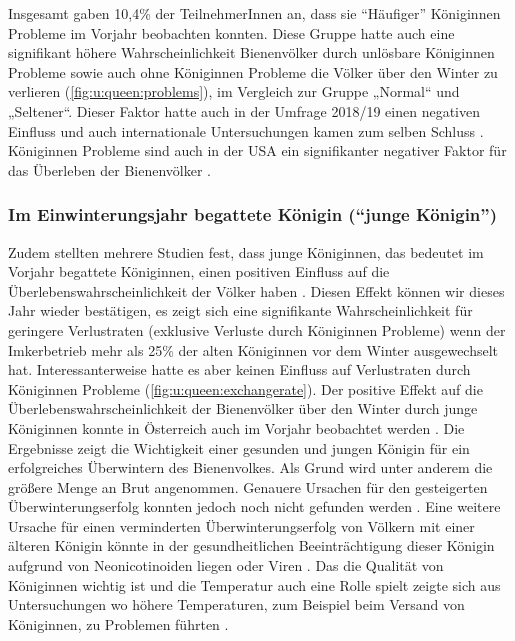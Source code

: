 Insgesamt gaben 10,4\% der TeilnehmerInnen an, dass sie \enquote{Häufiger} Königinnen Probleme im Vorjahr beobachten konnten. Diese Gruppe hatte auch eine signifikant höhere Wahrscheinlichkeit Bienenvölker durch unlösbare Königinnen Probleme sowie auch ohne Königinnen Probleme die Völker über den Winter zu verlieren (\cref{fig:u:queen:problems}), im Vergleich zur Gruppe „Normal`` und „Seltener``. Dieser Faktor hatte auch in der Umfrage 2018/19 einen negativen Einfluss \citep{oberreiter2020} und auch internationale Untersuchungen kamen zum selben Schluss \citep{vanderzee2014}. Königinnen Probleme sind auch in der USA ein signifikanter negativer Faktor für das Überleben der Bienenvölker \citep{vanengelsdorp2013}.

\subsubsection{Im Einwinterungsjahr begattete Königin (\enquote{junge Königin})}

Zudem stellten mehrere Studien fest, dass junge Königinnen, das bedeutet im Vorjahr begattete Königinnen, einen positiven Einfluss auf die Überlebenswahrscheinlichkeit der Völker haben \citep{vanderzee2014, genersch2010, giacobino2016, morawetz2019}. Diesen Effekt können wir dieses Jahr wieder bestätigen, es zeigt sich eine signifikante Wahrscheinlichkeit für geringere Verlustraten (exklusive Verluste durch Königinnen Probleme) wenn der Imkerbetrieb mehr als 25\% der alten Königinnen vor dem Winter ausgewechselt hat. Interessanterweise hatte es aber keinen Einfluss auf Verlustraten durch Königinnen Probleme (\cref{fig:u:queen:exchangerate}). Der positive Effekt auf die Überlebenswahrscheinlichkeit der Bienenvölker über den Winter durch junge Königinnen konnte in Österreich auch im Vorjahr beobachtet werden \citep{oberreiter2020}. 
\newline
Die Ergebnisse zeigt die Wichtigkeit einer gesunden und jungen Königin für ein erfolgreiches Überwintern des Bienenvolkes. Als Grund wird unter anderem die größere Menge an Brut angenommen. Genauere Ursachen für den gesteigerten Überwinterungserfolg konnten jedoch noch nicht gefunden werden \citep{genersch2010, amiri2017, ricigliano2018}. Eine weitere Ursache für einen verminderten Überwinterungserfolg von Völkern mit einer älteren Königin könnte in der gesundheitlichen Beeinträchtigung dieser Königin aufgrund von Neonicotinoiden liegen \citep{williams2015} oder Viren \citep{amiri2020a}. Das die Qualität von Königinnen wichtig ist und die Temperatur auch eine Rolle spielt zeigte sich aus Untersuchungen wo höhere Temperaturen, zum Beispiel beim Versand von Königinnen, zu Problemen führten \citep{withrow2019, rousseau2020}.


